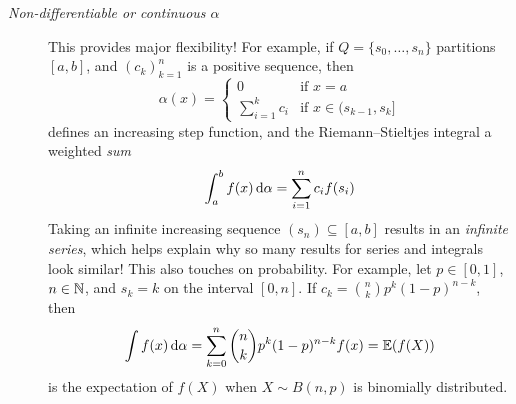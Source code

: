 \begin{description}
  
  \goodbreak


	\item[\normalfont\emph{Non-differentiable or continuous $\alpha$}] This provides major flexibility! For example, if $Q=\{s_0,\ldots,s_n\}$ partitions $[a,b]$, and $(c_k)_{k=1}^n$ is a positive sequence, then 
  \[
  	\alpha(x)=
  	\begin{cases}
  		0&\text{if }x=a\\
  		\sum\limits_{i=1}^kc_i&\text{if }x\in (s_{k-1},s_{k}]
  	\end{cases}
  \]
 	defines an increasing step function, and the Riemann--Stieltjes integral a weighted \emph{sum}
  \[
  	\int_a^bf(x)\,\mathrm{d}\alpha =\sum_{i=1}^nc_if(s_i)
  \]
  Taking an infinite increasing sequence $(s_n)\subseteq[a,b]$ results in an \emph{infinite series}, which helps explain why so many results for series and integrals look similar!\smallbreak
  This also touches on probability. For example, let $p\in[0,1]$, $n\in\mathbb{N}$, and $s_k=k$ on the interval $[0,n]$. If $c_k=\binom nk p^k(1-p)^{n-k}$, then
  \[\int f(x)\,\mathrm{d}\alpha =\sum_{k=0}^n\binom nk p^k(1-p)^{n-k} f(x)=\mathbb{E}(f(X))\]
  is the expectation of $f(X)$ when $X\sim B(n,p)$ is binomially distributed.
\end{description}




